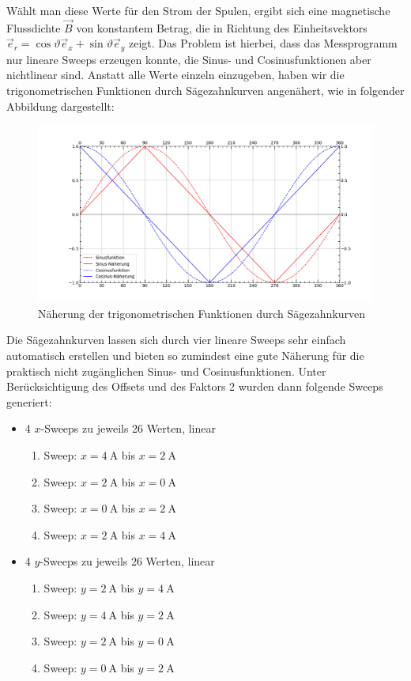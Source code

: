 \documentclass[german,  %
parskip=full,  %
]{scrartcl}
\begin{document}
Wählt man diese Werte für den Strom der Spulen, ergibt sich eine magnetische Flussdichte \(\vec{B}\) von konstantem Betrag, die in Richtung des Einheitsvektors \(\vec{e}_r = \cos\vartheta \vec{e}_x + \sin\vartheta \vec{e}_y\) zeigt. Das Problem ist hierbei, dass das Messprogramm nur lineare Sweeps erzeugen konnte, die Sinus- und Cosinusfunktionen aber nichtlinear sind. Anstatt alle Werte einzeln einzugeben, haben wir die trigonometrischen Funktionen durch Sägezahnkurven angenähert, wie in folgender Abbildung dargestellt: 
\newpage
\begin{figure}[h!]\centering
\includegraphics[width=\textwidth]{Sinus_und_Cosinus_Naeherung.png}
\caption{Näherung der trigonometrischen Funktionen durch Sägezahnkurven}
\end{figure} 
Die Sägezahnkurven lassen sich durch vier lineare Sweeps sehr einfach automatisch erstellen und bieten so zumindest eine gute Näherung für die praktisch nicht zugänglichen Sinus- und Cosinusfunktionen. Unter Berücksichtigung des Offsets und des Faktors 2 wurden dann folgende Sweeps generiert:
\begin{itemize}
\item 4 \(x\)-Sweeps zu jeweils 26 Werten, linear 
\begin{enumerate}
\item Sweep: \(x=4 \ \mathrm{A}\) bis \(x=2 \ \mathrm{A}\)
\item Sweep: \(x=2 \ \mathrm{A}\) bis \(x=0 \ \mathrm{A}\)
\item Sweep: \(x=0 \ \mathrm{A}\) bis \(x=2 \ \mathrm{A}\)
\item Sweep: \(x=2 \ \mathrm{A}\) bis \(x=4 \ \mathrm{A}\)
\end{enumerate}
\item 4 \(y\)-Sweeps zu jeweils 26 Werten, linear 
\begin{enumerate}
\item Sweep: \(y=2 \ \mathrm{A}\) bis \(y=4 \ \mathrm{A}\)
\item Sweep: \(y=4 \ \mathrm{A}\) bis \(y=2 \ \mathrm{A}\)
\item Sweep: \(y=2 \ \mathrm{A}\) bis \(y=0 \ \mathrm{A}\)
\item Sweep: \(y=0 \ \mathrm{A}\) bis \(y=2 \ \mathrm{A}\)
\end{enumerate}
\end{itemize}
\end{document}
